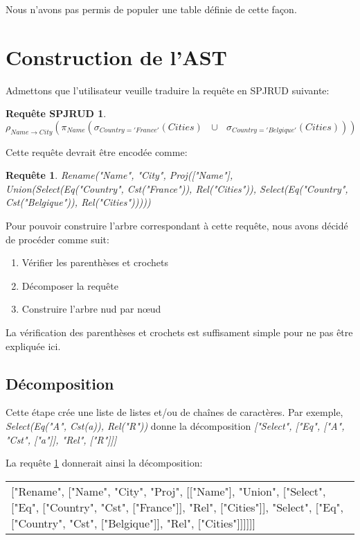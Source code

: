 \documentclass[]{article}
\newtheorem{SPJRUDRequest}{Requ\^ete SPJRUD}
\newtheorem{request}{Requ\^ete}
\begin{document}
Nous n'avons pas permis de populer une table d\'efinie de cette fa\c{c}on.

\section{Construction de l'AST}

Admettons que l'utilisateur veuille traduire la requ\^ete en SPJRUD suivante:

\begin{SPJRUDRequest}
$\rho_{Name \to City}(\pi_{Name}(\sigma_{Country='France'}(Cities) \text{ } \cup \text{ } \sigma_{Country='Belgique'}(Cities)))$
\end{SPJRUDRequest}

Cette requ\^ete devrait \^etre encod\'ee comme:

\begin{request}\label{request1}
Rename("Name", "City", Proj(["Name"], Union(Select(Eq("Country", Cst("France")), Rel("Cities")), Select(Eq("Country", Cst("Belgique")), Rel("Cities")))))
\end{request}

Pour pouvoir construire l'arbre correspondant \`a cette requ\^ete, nous avons d\'ecid\'e de proc\'eder comme suit:

\begin{enumerate}
	\item V\'erifier les parenth\`eses et crochets
	\item D\'ecomposer la requ\^ete
	\item Construire l'arbre n\œ{}ud par nœ{}ud
\end{enumerate}

La v\'erification des parenth\`eses et crochets est suffisament simple pour ne pas \^etre expliqu\'ee ici.

\subsection{D\'ecomposition}
Cette \'etape cr\'ee une liste de listes et/ou de chaînes de caract\`eres. Par exemple, \textit{Select(Eq("A", Cst(a)), Rel("R"))} donne la d\'ecomposition \textit{["Select", ["Eq", ["A", "Cst", ["a"]], "Rel", ["R"]]]}

La requ\^ete \ref{request1} donnerait ainsi la d\'ecomposition:

\begin{center}
	\begin{tabular}{p{250px}}
		["Rename", ["Name", "City", "Proj", [["Name"], "Union", ["Select", ["Eq", ["Country", "Cst", ["France"]], "Rel", ["Cities"]], "Select", ["Eq", ["Country", "Cst", ["Belgique"]], "Rel", ["Cities"]]]]]]
	\end{tabular}\label{"decomposition"}
\end{center}
\end{document}
